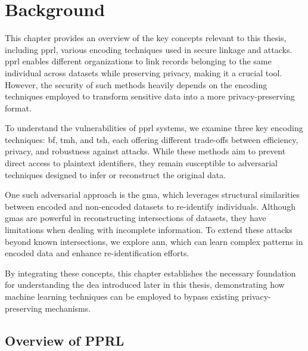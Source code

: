 \chapter{Background}  \label{sec:background}

This chapter provides an overview of the key concepts relevant to this thesis, including \ac{pprl}, various encoding techniques used in secure linkage and attacks.
\ac{pprl} enables different organizations to link records belonging to the same individual across datasets while preserving privacy, making it a crucial tool.
However, the security of such methods heavily depends on the encoding techniques employed to transform sensitive data into a more privacy-preserving format.

To understand the vulnerabilities of \ac{pprl} systems, we examine three key encoding techniques: \ac{bf}, \ac{tmh}, and \ac{tsh}, each offering different trade-offs between efficiency, privacy, and robustness against attacks.
While these methods aim to prevent direct access to plaintext identifiers, they remain susceptible to adversarial techniques designed to infer or reconstruct the original data.

One such adversarial approach is the \ac{gma}, which leverages structural similarities between encoded and non-encoded datasets to re-identify individuals.
Although \ac{gma}s are powerful in reconstructing intersections of datasets, they have limitations when dealing with incomplete information.
To extend these attacks beyond known intersections, we explore \ac{ann}, which can learn complex patterns in encoded data and enhance re-identification efforts.

By integrating these concepts, this chapter establishes the necessary foundation for understanding the \ac{dea} introduced later in this thesis, demonstrating how machine learning techniques can be employed to bypass existing privacy-preserving mechanisms.

\section{Overview of PPRL}  \label{sec:pprl}



